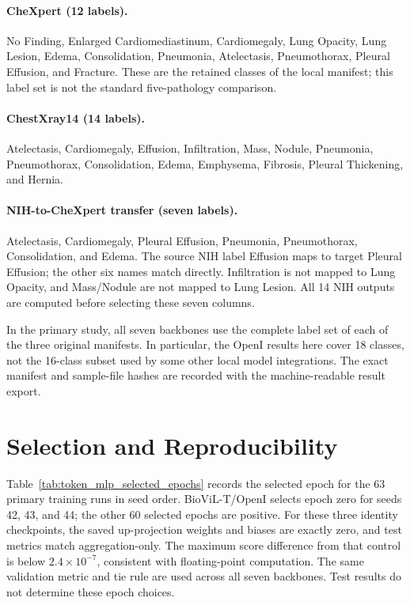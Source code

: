 \documentclass[10pt,twocolumn,letterpaper]{article}
\begin{document}
\paragraph{CheXpert (12 labels).}
No Finding, Enlarged Cardiomediastinum, Cardiomegaly, Lung Opacity, Lung Lesion, Edema, Consolidation, Pneumonia, Atelectasis, Pneumothorax, Pleural Effusion, and Fracture. These are the retained classes of the local manifest; this label set is not the standard five-pathology comparison.

\paragraph{ChestXray14 (14 labels).}
Atelectasis, Cardiomegaly, Effusion, Infiltration, Mass, Nodule, Pneumonia, Pneumothorax, Consolidation, Edema, Emphysema, Fibrosis, Pleural Thickening, and Hernia.

\paragraph{NIH-to-CheXpert transfer (seven labels).}
Atelectasis, Cardiomegaly, Pleural Effusion, Pneumonia, Pneumothorax, Consolidation, and Edema. The source NIH label Effusion maps to target Pleural Effusion; the other six names match directly. Infiltration is not mapped to Lung Opacity, and Mass/Nodule are not mapped to Lung Lesion. All 14 NIH outputs are computed before selecting these seven columns.

In the primary study, all seven backbones use the complete label set of each of the three original manifests. In particular, the OpenI results here cover 18 classes, not the 16-class subset used by some other local model integrations. The exact manifest and sample-file hashes are recorded with the machine-readable result export.

\section{Selection and Reproducibility}
\label{app:epochs}

Table~\ref{tab:token_mlp_selected_epochs} records the selected epoch for the 63 primary training runs in seed order. BioViL-T/OpenI selects epoch zero for seeds 42, 43, and 44; the other 60 selected epochs are positive. For these three identity checkpoints, the saved up-projection weights and biases are exactly zero, and test metrics match aggregation-only. The maximum score difference from that control is below $2.4\times10^{-7}$, consistent with floating-point computation. The same validation metric and tie rule are used across all seven backbones. Test results do not determine these epoch choices.
\end{document}
